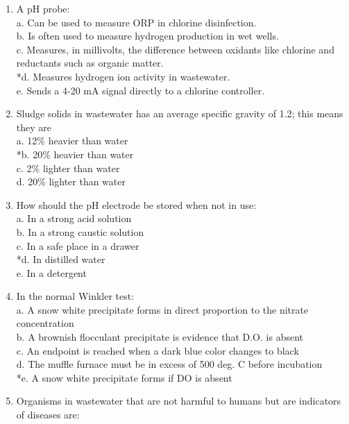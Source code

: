 \begin{enumerate}
\item A pH probe: \\

a. Can be used to measure ORP in chlorine disinfection. \\
b. Is often used to measure hydrogen production in wet wells. \\
c. Measures, in millivolts, the difference between oxidants like chlorine and reductants such as organic matter. \\
*d. Measures hydrogen ion activity in wastewater. \\
e. Sends a 4-20 mA signal directly to a chlorine controller. 

\item Sludge solids in wastewater has an average specific gravity of 1.2; this means they are \\

a. 12\% heavier than water \\
*b. 20\% heavier than water \\
c. 2\% lighter than water \\
d. 20\% lighter than water 

\item How should the pH electrode be stored when not in use: \\

a. In a strong acid solution \\
b. In a strong caustic solution \\
c. In a safe place in a drawer \\
*d. In distilled water \\
e. In a detergent 

\item In the normal Winkler test: \\

a. A snow white precipitate forms in direct proportion to the nitrate concentration \\
b. A brownish flocculant precipitate is evidence that D.O. is absent \\
c. An endpoint is reached when a dark blue color changes to black \\
d. The muffle furnace must be in excess of 500 deg. C before incubation \\
*e. A snow white precipitate forms if DO is absent 

\item Organisms in wastewater that are not harmful to humans but are indicators of diseases are: \\


\end{enumerate}
